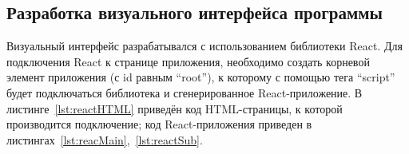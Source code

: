 \subsection{Разработка визуального интерфейса программы}

Визуальный интерфейс разрабатывался с использованием библиотеки React. Для подключения React к странице приложения, необходимо создать корневой элемент приложения (с id равным ``root''), к которому с помощью тега ``script'' будет подключаться библиотека и сгенерированное React-приложение. В листинге~\ref{lst:reactHTML} приведён код HTML-страницы, к которой производится подключение; код React-приложения приведен в листингах~\ref{lst:reacMain},~\ref{lst:reactSub}.





